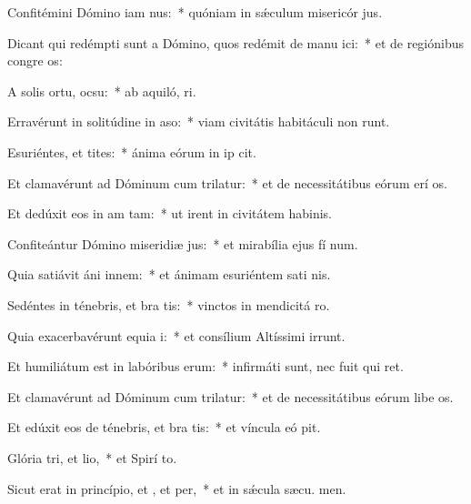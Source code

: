 \item Confitémini Dómino iam nus:~* quóniam in sǽculum misericór jus.
\item Dicant qui redémpti sunt a Dómino, quos redémit de manu ici:~* et de regiónibus congre os:
\item A solis ortu,  ocsu:~* ab aquiló,  ri.
\item Erravérunt in solitúdine in aso:~* viam civitátis habitáculi non runt.
\item Esuriéntes, et tites:~* ánima eórum in ip cit.
\item Et clamavérunt ad Dóminum cum trilatur:~* et de necessitátibus eórum erí os.
\item Et dedúxit eos in am tam:~* ut irent in civitátem habinis.
\item Confiteántur Dómino miseridiæ jus:~* et mirabília ejus fí num.
\item Quia satiávit áni innem:~* et ánimam esuriéntem sati nis.
\item Sedéntes in ténebris, et bra tis:~* vinctos in mendicitá  ro.
\item Quia exacerbavérunt equia i:~* et consílium Altíssimi irrunt.
\item Et humiliátum est in labóribus  erum:~* infirmáti sunt, nec fuit qui ret.
\item Et clamavérunt ad Dóminum cum trilatur:~* et de necessitátibus eórum libe os.
\item Et edúxit eos de ténebris, et bra tis:~* et víncula eó pit.
\item Glória tri, et lio,~* et Spirí to.
\item Sicut erat in princípio, et , et per,~* et in sǽcula sæcu. men.
